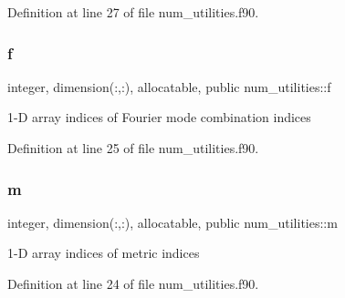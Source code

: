 Definition at line 27 of file num\+\_\+utilities.\+f90.

\mbox{\label{namespacenum__utilities_a8e3399292fcb3a5fc35ae87f7811bbb5}} 
\subsubsection{\texorpdfstring{f}{f}}
{\footnotesize\ttfamily integer, dimension(\+:,\+:), allocatable, public num\+\_\+utilities\+::f}



1-\/D array indices of Fourier mode combination indices 



Definition at line 25 of file num\+\_\+utilities.\+f90.

\mbox{\label{namespacenum__utilities_ad7a7ae2abf02a2df9e00b2aca669617c}} 
\subsubsection{\texorpdfstring{m}{m}}
{\footnotesize\ttfamily integer, dimension(\+:,\+:), allocatable, public num\+\_\+utilities\+::m}



1-\/D array indices of metric indices 



Definition at line 24 of file num\+\_\+utilities.\+f90.

